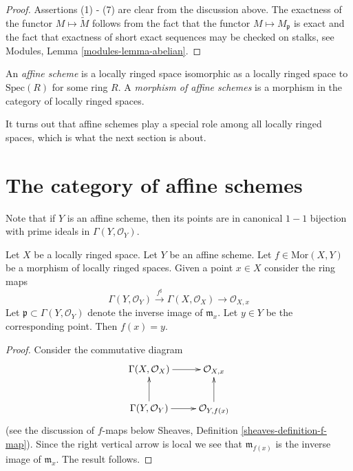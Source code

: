 \begin{proof}
Assertions (1) - (7) are clear from the discussion above.
The exactness of the functor $M \mapsto \widetilde M$
follows from the fact that the functor $M \mapsto M_{\mathfrak p}$
is exact and the fact that exactness of short exact sequences
may be checked on stalks, see
Modules, Lemma \ref{modules-lemma-abelian}.
\end{proof}

\begin{definition}
\label{definition-affine-scheme}
An {\it affine scheme} is a locally ringed space isomorphic
as a locally ringed space to $\text{Spec}(R)$ for some ring $R$. 
A {\it morphism of affine schemes} is a morphism in the category
of locally ringed spaces.
\end{definition}

\noindent
It turns out that affine schemes play a special role
among all locally ringed spaces, which is what the next
section is about.


















\section{The category of affine schemes}
\label{section-category-affine-schemes}

\noindent
Note that if $Y$ is an affine scheme, then its
points are in canonical $1-1$ bijection with
prime ideals in $\Gamma(Y, \mathcal{O}_Y)$.

\begin{lemma}
\label{lemma-morphism-into-affine-where-point-goes}
Let $X$ be a locally ringed space.
Let $Y$ be an affine scheme.
Let $f \in \text{Mor}(X, Y)$ be a morphism
of locally ringed spaces. Given a point $x \in X$
consider the ring maps
$$
\Gamma(Y, \mathcal{O}_Y) \xrightarrow{f^\sharp}
\Gamma(X, \mathcal{O}_X) \to \mathcal{O}_{X, x}
$$
Let $\mathfrak p \subset \Gamma(Y, \mathcal{O}_Y)$ denote
the inverse image of $\mathfrak m_x$. Let $y \in Y$ be the
corresponding point. Then $f(x) = y$.
\end{lemma}

\begin{proof}
Consider the commutative diagram
$$
\xymatrix{
\Gamma(X, \mathcal{O}_X) \ar[r] &
\mathcal{O}_{X, x} \\
\Gamma(Y, \mathcal{O}_Y) \ar[r] \ar[u] &
\mathcal{O}_{Y, f(x)} \ar[u]
}
$$
(see the discussion of $f$-maps below
Sheaves, Definition \ref{sheaves-definition-f-map}).
Since the right vertical arrow is local
we see that $\mathfrak m_{f(x)}$ is the
inverse image of $\mathfrak m_x$. The result
follows.
\end{proof}

